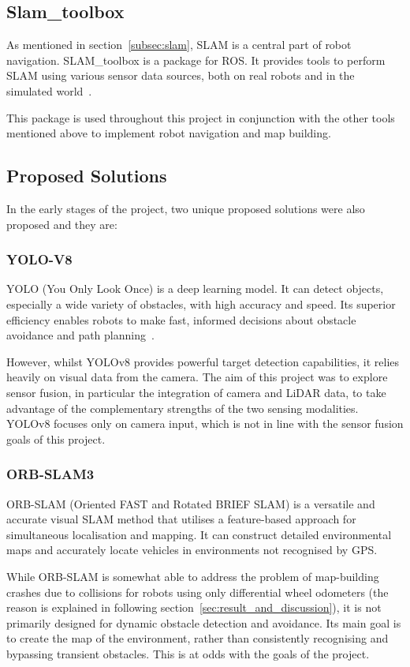 \subsection{Slam\_toolbox}
As mentioned in section~\ref{subsec:slam}, SLAM is a central part of robot navigation. SLAM\_toolbox is a package for ROS. 
It provides tools to perform SLAM using various sensor data sources, both on real robots and in the simulated world~\cite{slamtoolbox}.

This package is used throughout this project in conjunction with the other tools mentioned above to implement robot navigation and map building.

\subsection{Proposed Solutions}
In the early stages of the project, two unique proposed solutions were also proposed and they are:
\subsubsection{YOLO-V8}
YOLO (You Only Look Once) is a deep learning model. 
It can detect objects, especially a wide variety of obstacles, with high accuracy and speed. 
Its superior efficiency enables robots to make fast, informed decisions about obstacle avoidance and path planning~\cite{yolo}.

However, whilst YOLOv8 provides powerful target detection capabilities, 
it relies heavily on visual data from the camera. 
The aim of this project was to explore sensor fusion, in particular the integration of camera and LiDAR data, 
to take advantage of the complementary strengths of the two sensing modalities. 
YOLOv8 focuses only on camera input, which is not in line with the sensor fusion goals of this project.
\subsubsection{ORB-SLAM3}
ORB-SLAM (Oriented FAST and Rotated BRIEF SLAM) is a versatile and accurate visual SLAM method 
that utilises a feature-based approach for simultaneous localisation and mapping. 
It can construct detailed environmental maps and accurately locate vehicles in environments not recognised by GPS.

While ORB-SLAM is somewhat able to address the problem of map-building crashes due to collisions for robots using only differential wheel odometers
(the reason is explained in following section~\ref{sec:result_and_discussion}),
it is not primarily designed for dynamic obstacle detection and avoidance. 
Its main goal is to create the map of the environment, rather than consistently recognising and bypassing transient obstacles.
This is at odds with the goals of the project.
